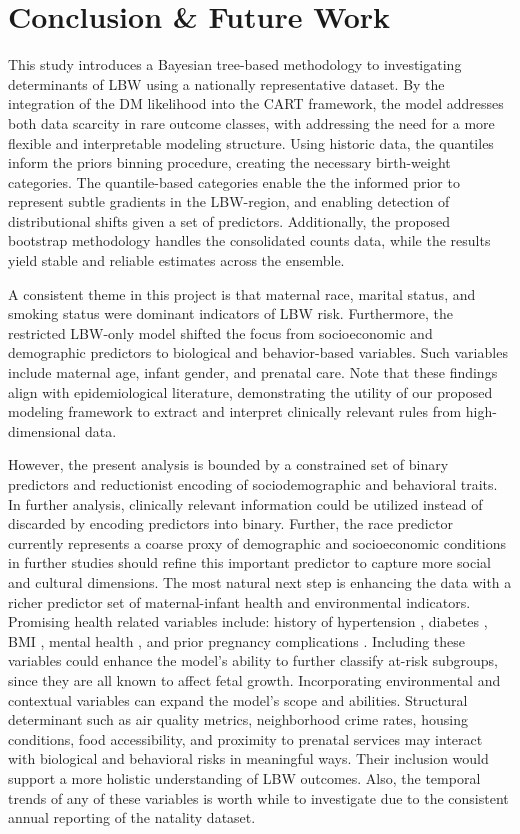 \chapter{Conclusion \& Future Work}
\label{chap:conclusion}

This study introduces a Bayesian tree-based methodology to investigating determinants of LBW using a nationally representative dataset. By the integration of the DM likelihood into the CART framework, the model addresses both data scarcity in rare outcome classes, with addressing the need for a more flexible and interpretable modeling structure. Using historic data, the quantiles inform the priors binning procedure, creating the necessary birth-weight categories. The quantile-based categories enable the the informed prior to represent subtle gradients in the LBW-region, and enabling detection of distributional shifts given a set of predictors. Additionally, the proposed bootstrap methodology handles the consolidated counts data, while the results yield stable and reliable estimates across the ensemble. 

A consistent theme in this project is that maternal race, marital status, and smoking status were dominant indicators of LBW risk. Furthermore, the restricted LBW-only model shifted the focus from socioeconomic and demographic predictors to biological and behavior-based variables. Such variables include maternal age, infant gender, and prenatal care. Note that these findings align with epidemiological literature, demonstrating the utility of our proposed modeling framework to extract and interpret clinically relevant rules from high-dimensional data. 

However, the present analysis is bounded by a constrained set of binary predictors and reductionist encoding of sociodemographic and behavioral traits. In further analysis, clinically relevant information could be utilized instead of discarded by encoding predictors into binary. Further, the race predictor currently represents a coarse proxy of demographic and socioeconomic conditions in further studies should refine this important predictor to capture more social and cultural dimensions. The most natural next step is enhancing the data with a richer predictor set of maternal-infant health and environmental indicators. Promising health related variables include: history of hypertension \citep{hypertension_lbw}, diabetes \citep{diabetes_lbw}, BMI \citep{bmi_lbw} , mental health \citep{mental_lbw}, and prior pregnancy complications \citep{prior_lbw}. Including these variables could enhance the model's ability to further classify at-risk subgroups, since they are all known to affect fetal growth. Incorporating environmental and contextual variables can expand the model's scope and abilities. Structural determinant such as air quality metrics, neighborhood crime rates, housing conditions, food accessibility, and proximity to prenatal services may interact with biological and behavioral risks in meaningful ways. Their inclusion would support a more holistic understanding of LBW outcomes. Also, the temporal trends of any of these variables is worth while to investigate due to the consistent annual reporting of the natality dataset.

